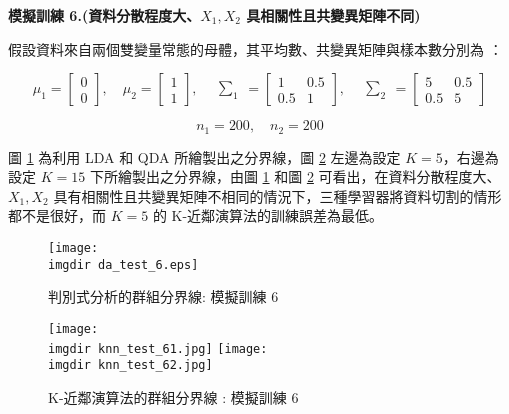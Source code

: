 \textbf{\large 模擬訓練 6.(資料分散程度大、$X_1, X_2$ 具相關性且共變異矩陣不同)}

假設資料來自兩個雙變量常態的母體，其平均數、共變異矩陣與樣本數分別為 ：

\[\mu_1 = \begin{bmatrix}
0 \\
0
\end{bmatrix}, \quad \mu_2 = \begin{bmatrix}
1 \\
1
\end{bmatrix}, \quad \begin{matrix} \sum_{1} \end{matrix} = \begin{bmatrix}
1 & 0.5\\
0.5 & 1
\end{bmatrix}, \quad \begin{matrix} \sum_{2} \end{matrix} = \begin{bmatrix}
5 & 0.5\\
0.5 & 5
\end{bmatrix}\]

\[n_1 = 200, \quad n_2 = 200\]

圖 \ref{fig:da_test_6} 為利用 LDA 和 QDA 所繪製出之分界線，圖 \ref{fig:knn_test_6} 左邊為設定 $K =5$，右邊為設定 $K = 15$ 下所繪製出之分界線，由圖 \ref{fig:da_test_6} 和圖 \ref{fig:knn_test_6} 可看出，在資料分散程度大、$X_1, X_2$ 具有相關性且共變異矩陣不相同的情況下，三種學習器將資料切割的情形都不是很好，而 $K = 5$ 的 K-近鄰演算法的訓練誤差為最低。
\begin{figure}[H]
    \centering
        \texttt{[image: \\imgdir da\_test\_6.eps]}
    \caption{判別式分析的群組分界線: 模擬訓練 6}
    \label{fig:da_test_6}
\end{figure}

\begin{figure}[H]
\centering
\texttt{[image: \\imgdir knn\_test\_61.jpg]}
\texttt{[image: \\imgdir knn\_test\_62.jpg]}
\caption{K-近鄰演算法的群組分界線 : 模擬訓練 6} 
\label{fig:knn_test_6}
\end{figure}

